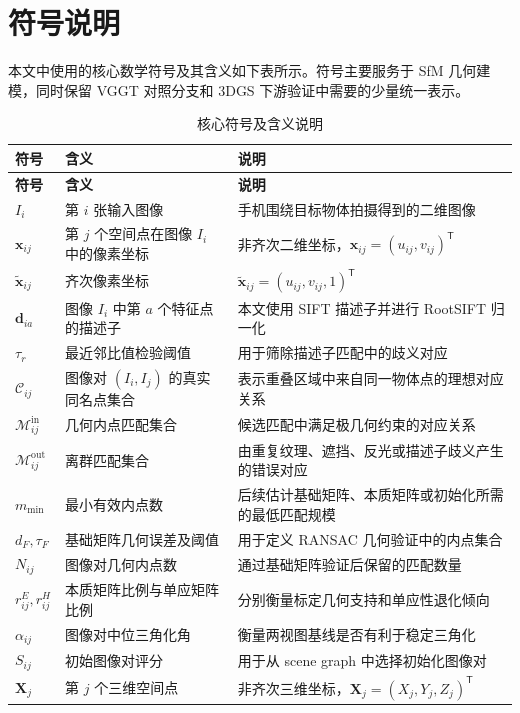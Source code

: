\documentclass[lang=cn,a4paper,newtx]{elegantpaper} %
\begin{document}
\section{符号说明}
本文中使用的核心数学符号及其含义如下表所示。符号主要服务于 SfM 几何建模，同时保留 VGGT 对照分支和 3DGS 下游验证中需要的少量统一表示。
\begin{longtable}{>{\centering\arraybackslash}p{}p{}p{}}
\caption{核心符号及含义说明}\\
\toprule
\textbf{符号} & \textbf{含义} & \textbf{说明} \\ \midrule
\endfirsthead
\toprule
\textbf{符号} & \textbf{含义} & \textbf{说明} \\ \midrule
\endhead
$I_i$ & 第 $i$ 张输入图像 & 手机围绕目标物体拍摄得到的二维图像 \\
$\mathbf{x}_{ij}$ & 第 $j$ 个空间点在图像 $I_i$ 中的像素坐标 & 非齐次二维坐标，$\mathbf{x}_{ij}=(u_{ij},v_{ij})^\mathsf{T}$ \\
$\tilde{\mathbf{x}}_{ij}$ & 齐次像素坐标 & $\tilde{\mathbf{x}}_{ij}=(u_{ij},v_{ij},1)^\mathsf{T}$ \\
$\mathbf{d}_{ia}$ & 图像 $I_i$ 中第 $a$ 个特征点的描述子 & 本文使用 SIFT 描述子并进行 RootSIFT 归一化 \\
$\tau_r$ & 最近邻比值检验阈值 & 用于筛除描述子匹配中的歧义对应 \\
$\mathcal{C}_{ij}$ & 图像对 $(I_i,I_j)$ 的真实同名点集合 & 表示重叠区域中来自同一物体点的理想对应关系 \\
$\mathcal{M}_{ij}^{\mathrm{in}}$ & 几何内点匹配集合 & 候选匹配中满足极几何约束的对应关系 \\
$\mathcal{M}_{ij}^{\mathrm{out}}$ & 离群匹配集合 & 由重复纹理、遮挡、反光或描述子歧义产生的错误对应 \\
$m_{\min}$ & 最小有效内点数 & 后续估计基础矩阵、本质矩阵或初始化所需的最低匹配规模 \\
$d_F,\tau_F$ & 基础矩阵几何误差及阈值 & 用于定义 RANSAC 几何验证中的内点集合 \\
$N_{ij}$ & 图像对几何内点数 & 通过基础矩阵验证后保留的匹配数量 \\
$r_{ij}^{E}, r_{ij}^{H}$ & 本质矩阵比例与单应矩阵比例 & 分别衡量标定几何支持和单应性退化倾向 \\
$\alpha_{ij}$ & 图像对中位三角化角 & 衡量两视图基线是否有利于稳定三角化 \\
$S_{ij}$ & 初始图像对评分 & 用于从 scene graph 中选择初始化图像对 \\
$\mathbf{X}_j$ & 第 $j$ 个三维空间点 & 非齐次三维坐标，$\mathbf{X}_j=(X_j,Y_j,Z_j)^\mathsf{T}$ \\

\end{longtable}
\end{document}
